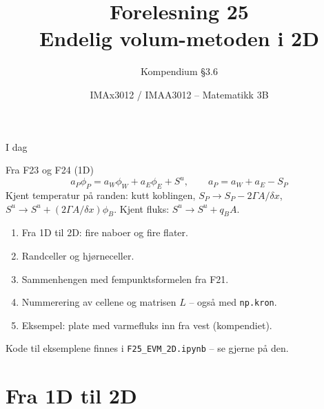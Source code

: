 \documentclass[11pt,aspectratio=169]{beamer}
\title[F25 -- Endelig volum i 2D]{Forelesning 25\\ Endelig volum-metoden i 2D}
\subtitle{Kompendium §3.6}
\author{IMAx3012 / IMAA3012 -- Matematikk 3B}
\date{}
\begin{document}
\begin{frame}
\titlepage
\end{frame}

\begin{frame}{I dag}
\begin{remb}{Fra F23 og F24 (1D)}
\[
a_P\phi_P = a_W\phi_W + a_E\phi_E + S^u, \qquad a_P = a_W + a_E - S_P
\]
Kjent temperatur på randen: kutt koblingen, $S_P \to S_P - 2\Gamma A/\delta x$, $S^u \to S^u + (2\Gamma A/\delta x)\phi_B$. \quad Kjent fluks: $S^u \to S^u + q_BA$.
\end{remb}
\begin{enumerate}
\item Fra 1D til 2D: fire naboer og fire flater.
\item Randceller og hjørneceller.
\item Sammenhengen med fempunktsformelen fra F21.
\item Nummerering av cellene og matrisen $L$ -- også med \texttt{np.kron}.
\item Eksempel: plate med varmefluks inn fra vest (kompendiet).
\end{enumerate}
\medskip
Kode til eksemplene finnes i \texttt{F25\_EVM\_2D.ipynb} -- se gjerne på den.
\end{frame}

\section{Fra 1D til 2D}
\end{document}

